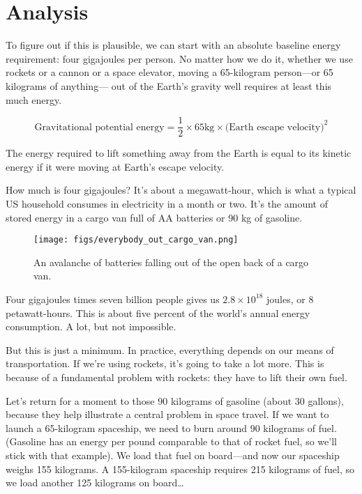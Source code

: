 
\chapter{Analysis}
\label{chap:analysis}

To figure out if this is plausible,
we can start with an absolute baseline energy requirement:
four gigajoules per person.
%
No matter how we do it,
whether we use rockets or a cannon or a space elevator,
moving a 65-kilogram person---or 65 kilograms of anything---%
out of the Earth's gravity well requires at least this much energy.

\begin{equation*}
\text{Gravitational potential energy} = \frac{1}{2} \times 65\mathrm{kg} \times \text{(Earth escape velocity)}^{2}
\end{equation*}

The energy required to lift something away from the Earth
is equal to its kinetic energy if it were moving at Earth's escape velocity.

How much is four gigajoules?
It's about a megawatt-hour,
which is what a typical US household consumes in electricity in a month or two.
It's the amount of stored energy in a cargo van full of AA batteries or 90 kg of gasoline.

\begin{figure}[hp]
\centering
\texttt{[image: figs/everybody\_out\_cargo\_van.png]}
\caption{
    An avalanche of batteries falling out of the open back of a cargo van.
}
\label{fig:battery-van}
\end{figure}

Four gigajoules times seven billion people gives us
$2.8 \times 10^{18}$ joules, or 8 petawatt-hours.
This is about five percent of the world's annual energy consumption.
A lot, but not impossible.

But this is just a minimum.
In practice, everything depends on our means of transportation.
If we're using rockets, it's going to take a lot more.
This is because of a fundamental problem with rockets:
they have to lift their own fuel.

Let's return for a moment to those 90 kilograms of gasoline (about 30 gallons),
because they help illustrate a central problem in space travel.
If we want to launch a 65-kilogram spaceship,
we need to burn around 90 kilograms of fuel.
(Gasoline has an energy per pound comparable to that of rocket fuel,
so we'll stick with that example).
We load that fuel on board---and now our spaceship weighs 155 kilograms.
A 155-kilogram spaceship requires 215 kilograms of fuel,
so we load another 125 kilograms on board\dots

